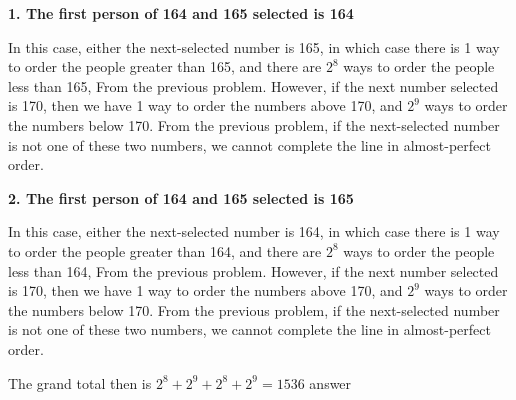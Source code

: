 \documentclass[11pt]{article}
\begin{document}
\begin{solution}{3}
\textbf{1. The first person of 164 and 165 selected is 164}

In this case, either the next-selected number is 165, in which case there is 1 
way to order the people greater
than 165, and there are  $2^{8}$ ways to order the people less than 165, From 
the previous problem. However, if the next number selected is 170, then 
we have 1 way to order the numbers above 170, and $2^{9}$ ways to order the 
numbers below 170. From the previous problem, if the next-selected number
is not one of these two numbers, we cannot complete the line in almost-perfect 
order.

\textbf{2. The first person of 164 and 165 selected is 165} 

In this case, either the next-selected number is 164, in which case there is 1 
way to order the people greater
than 164, and there are  $2^{8}$ ways to order the people less than 164, From 
the previous problem. However, if the next number selected is 170, then 
we have 1 way to order the numbers above 170, and $2^{9}$ ways to order the 
numbers below 170. From the previous problem, if the next-selected number
is not one of these two numbers, we cannot complete the line in almost-perfect 
order.

The grand total then is $2^{8} + 2^{9} + 2^{8} + 2^{9} = 1536$  %
answer
\end{solution}
\begin{solution}{4}
\end{solution}
\end{document}
